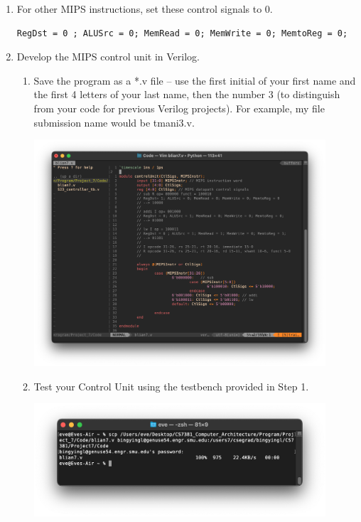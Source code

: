 \documentclass[12pt]{article}
\begin{document}
\begin{enumerate}
    \item For other MIPS instructions, set these control signals to 0.
\begin{verbatim}
RegDst = 0 ; ALUSrc = 0; MemRead = 0; MemWrite = 0; MemtoReg = 0;
\end{verbatim}
    \item Develop the MIPS control unit in Verilog.
    \begin{enumerate}
        \item Save the program as a *.v file – use the first initial of your first name and the first 4 letters of your last name, then the number 3 (to distinguish from your code for previous Verilog projects). For example, my file submission name would be tmani3.v.
                    \begin{center}
        \includegraphics[width=0.9\textwidth]{p3.png}
        \end{center}
        \item Test your Control Unit using the testbench provided in Step 1.
                    \begin{center}
        \includegraphics[width=0.9\textwidth]{p4.png}

\end{center}
\end{enumerate}
\end{enumerate}
\end{document}
